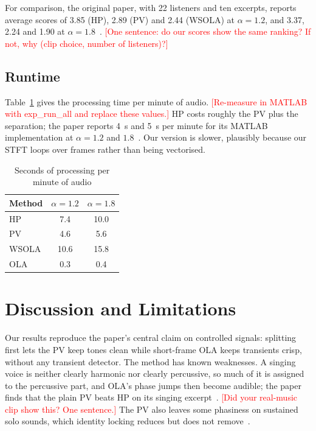 \documentclass[conference]{IEEEtran}
\newcommand{\fillin}[1]{\textcolor{red}{[#1]}}
\begin{document}
For comparison, the original paper, with 22 listeners and ten excerpts, reports average scores of 3.85 (HP), 2.89 (PV) and 2.44 (WSOLA) at $\alpha=1.2$, and 3.37, 2.24 and 1.90 at $\alpha=1.8$~\cite{driedger14}. \fillin{One sentence: do our scores show the same ranking? If not, why (clip choice, number of listeners)?}

\subsection{Runtime}
Table~\ref{tab:runtime} gives the processing time per minute of audio. \fillin{Re-measure in MATLAB with exp\_run\_all and replace these values.} HP costs roughly the PV plus the separation; the paper reports 4~s and 5~s per minute for its MATLAB implementation at $\alpha=1.2$ and $1.8$~\cite{driedger14}. Our version is slower, plausibly because our STFT loops over frames rather than being vectorised.

\begin{table}[t]
\centering
\caption{Seconds of processing per minute of audio}
\label{tab:runtime}
\begin{tabular}{@{}lcc@{}}
\toprule
Method & $\alpha=1.2$ & $\alpha=1.8$ \\
\midrule
HP & 7.4 & 10.0 \\
PV & 4.6 & 5.6 \\
WSOLA & 10.6 & 15.8 \\
OLA & 0.3 & 0.4 \\
\bottomrule
\end{tabular}
\end{table}

\section{Discussion and Limitations}
\label{sec:discussion}

Our results reproduce the paper's central claim on controlled signals: splitting first lets the PV keep tones clean while short-frame OLA keeps transients crisp, without any transient detector. The method has known weaknesses. A singing voice is neither clearly harmonic nor clearly percussive, so much of it is assigned to the percussive part, and OLA's phase jumps then become audible; the paper finds that the plain PV beats HP on its singing excerpt~\cite{driedger14}. \fillin{Did your real-music clip show this? One sentence.} The PV also leaves some phasiness on sustained solo sounds, which identity locking reduces but does not remove~\cite{laroche99}.
\end{document}
